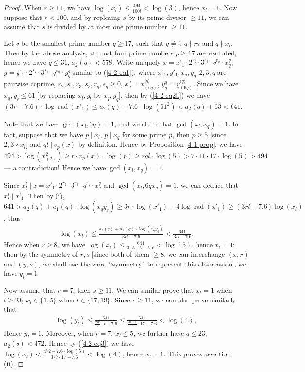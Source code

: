 \documentclass[a4paper, 12pt]{article}
\DeclareMathOperator{\rad}{\text{rad}}
\newcommand{\lagk}[1]{\langle #1 \rangle}
\numberwithin{equation}{section}
\theoremstyle{definition}
\begin{document}
\begin{proof}
When $r \ge 11$, we have $\log(x_l) \le \frac{494}{100 l} < \log(3)$, hence $x_l = 1$. Now suppose that $r < 100$, and by replcaing $s$ by its prime divisor $\ge 11$, we can assume that $s$ is divided by at most one prime number $\ge 11$.

Let $q$ be the smallest prime number $q\ge 17$, such that $q\neq l$, $q\nmid rs$ and $q \nmid x_l$. Then by the above analysis, at most four prime numbers $p\ge 17$ are excluded, hence we have $q \le 31$, $a_2(q) < 578$.
Write uniquely $x = x'_1 \cdot 2^{r_2} \cdot 3^{r_3}\cdot q^{r_q} \cdot x_q^{q}$, $y = y'_1 \cdot 2^{s_2} \cdot 3^{s_3}\cdot q^{s_q} \cdot y_q^{q}$ similar to (\ref{4-2-eq1}), where $x'_1, y'_1, x_q, y_q, 2, 3, q$ are pairwise coprime, $r_2, s_2, r_3, s_3, r_q, s_q \ge 0$, $x_q^q = x_{(6q)}^{\lagk{q}}$, $y_q^q = y_{(6q)}^{\lagk{q}}$.
Since we have $x_q,y_q \le 61$ [by replacing $x_l,y_l$ by $x_q, y_q$], then by  (\ref{4-2-eq2b}) we have $(3r - 7.6) \cdot \log\rad(x'_1) \le a_2(q) + 7.6 \cdot \log(61^2) < a_2(q) + 63 < 641$.

Note that we have $\gcd(x_l, 6q) = 1$, and we claim that $\gcd(x_l, x_q) = 1$. 
In fact, suppose that we have $p \mid x_l$, $p\mid x_q$ for some prime $p$, then $p\ge 5$ [since $2,3 \nmid x_l$] and $ql \mid v_p(x)$ by definition. 
Hence by Proposition \ref{4-1-prop}, we have $494 > \log(x_{(2)}^2) \ge r\cdot v_p(x)\cdot \log(p) \ge rql \cdot\log(5) > 7\cdot 11\cdot 17\cdot \log(5) > 494$ --- a contradiction! Hence we have $\gcd(x_l, x_q) = 1$.

Since $x_l^l \mid x = x'_1 \cdot 2^{r_2}\cdot 3^{r_3} \cdot q^{r_q} \cdot x_q^{q}$ and $\gcd(x_l, 6 q x_q) = 1$, we can deduce that $x_l^l \mid x'_1$. 
Then by (i), $641 > a_2(q)+a_1(q)\cdot\log(x_q y_q) \ge 3r\cdot \log(x'_1) - 4\log\rad(x'_1)  \ge (3rl-7.6) \log(x_l)$, thus 
\small\begin{align}  \label{4-2-eq3}
\log(x_l) \le \frac{ a_2(q)+a_1(q)\cdot\log(x_q y_q)}{3r l-7.6} 
< \frac{641}{3r l-7.6}.
\end{align}\normalsize
Hence when $r \ge 8$, we have $\log(x_l) \le \frac{ 641}{3\cdot 8\cdot 17 - 7.6} < \log(5)$, hence $x_l = 1$; then by the symmetry of $r,s$ [since both of them $\ge 8$, we can interchange $(x,r)$ and $(y,s)$, we shall use the word ``symmetry'' to represent this observasion], we have $y_l = 1$.

Now assume that $r = 7$, then $s\ge 11$. We can similar prove that $x_l = 1$ when $l\ge 23$; $x_l \in \{1,5\}$ when $l\in \{17,19\}$. Since $s\ge 11$, we can also prove similarly that 
\small\begin{align*} 
\log(y_l) \le \frac{ 641}{\frac{20s}{7}\cdot l-7.6}
\le \frac{ 641 }{\frac{20\cdot 11}{7}\cdot 17 - 7.6} < \log(4),
\end{align*}\normalsize
Hence $y_l = 1$. Moreover, when $r = 7$, $x_l \le 5$, we further have $q \le 23$, $a_2(q) < 472$. Hence by (\ref{4-2-eq3}) we have $\log(x_l) < \frac{472 + 7.6 \cdot \log(5)}{3\cdot 7\cdot 17 - 7.6} < \log(4)$, hence $x_l = 1$. This proves assertion (ii).


\end{proof}
\end{document}
